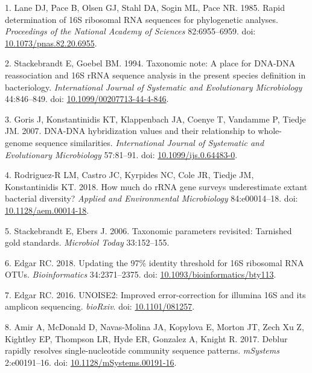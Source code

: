 \documentclass[
]{article}
\newenvironment{cslreferences}%
  {}%
  {\par}
\begin{document}
\hypertarget{refs}{}
\begin{cslreferences}
\leavevmode\hypertarget{ref-Lane1985}{}%
1. Lane DJ, Pace B, Olsen GJ, Stahl DA, Sogin ML, Pace NR. 1985. Rapid
determination of 16S ribosomal RNA sequences for phylogenetic analyses.
\emph{Proceedings of the National Academy of Sciences} 82:6955--6959.
doi:
\href{https://doi.org/10.1073/pnas.82.20.6955}{10.1073/pnas.82.20.6955}.

\leavevmode\hypertarget{ref-Stackebrandt1994}{}%
2. Stackebrandt E, Goebel BM. 1994. Taxonomic note: A place for DNA-DNA
reassociation and 16S rRNA sequence analysis in the present species
definition in bacteriology. \emph{International Journal of Systematic
and Evolutionary Microbiology} 44:846--849. doi:
\href{https://doi.org/10.1099/00207713-44-4-846}{10.1099/00207713-44-4-846}.

\leavevmode\hypertarget{ref-Goris2007}{}%
3. Goris J, Konstantinidis KT, Klappenbach JA, Coenye T, Vandamme P,
Tiedje JM. 2007. DNA-DNA hybridization values and their relationship to
whole-genome sequence similarities. \emph{International Journal of
Systematic and Evolutionary Microbiology} 57:81--91. doi:
\href{https://doi.org/10.1099/ijs.0.64483-0}{10.1099/ijs.0.64483-0}.

\leavevmode\hypertarget{ref-RodriguezR2018}{}%
4. Rodriguez-R LM, Castro JC, Kyrpides NC, Cole JR, Tiedje JM,
Konstantinidis KT. 2018. How much do rRNA gene surveys underestimate
extant bacterial diversity? \emph{Applied and Environmental
Microbiology} 84:e00014--18. doi:
\href{https://doi.org/10.1128/aem.00014-18}{10.1128/aem.00014-18}.

\leavevmode\hypertarget{ref-Stackebrandt2006}{}%
5. Stackebrandt E, Ebers J. 2006. Taxonomic parameters revisited:
Tarnished gold standards. \emph{Microbiol Today} 33:152--155.

\leavevmode\hypertarget{ref-Edgar2018}{}%
6. Edgar RC. 2018. Updating the 97\% identity threshold for 16S
ribosomal RNA OTUs. \emph{Bioinformatics} 34:2371--2375. doi:
\href{https://doi.org/10.1093/bioinformatics/bty113}{10.1093/bioinformatics/bty113}.

\leavevmode\hypertarget{ref-Edgar2016}{}%
7. Edgar RC. 2016. UNOISE2: Improved error-correction for illumina 16S
and its amplicon sequencing. \emph{bioRxiv}. doi:
\href{https://doi.org/10.1101/081257}{10.1101/081257}.

\leavevmode\hypertarget{ref-Amir2017}{}%
8. Amir A, McDonald D, Navas-Molina JA, Kopylova E, Morton JT, Zech Xu
Z, Kightley EP, Thompson LR, Hyde ER, Gonzalez A, Knight R. 2017. Deblur
rapidly resolves single-nucleotide community sequence patterns.
\emph{mSystems} 2:e00191--16. doi:
\href{https://doi.org/10.1128/mSystems.00191-16}{10.1128/mSystems.00191-16}.


\end{cslreferences}
\end{document}
